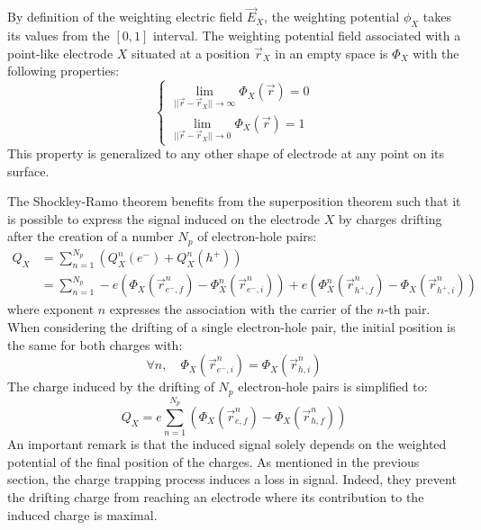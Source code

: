 By definition of the weighting electric field $\vec{E}_X$, the weighting potential $\phi_X$ takes its values from the $[0,1]$ interval. The weighting potential field associated with a point-like electrode $X$ situated at a position $\vec{r}_X$ in an empty space is $\Phi_X$ with the following properties:
\begin{equation}
\label{eq:ramo-particle}
\begin{cases}
\lim_{||\vec{r} - \vec{r}_X|| \to \infty} \Phi_X(\vec{r}) = 0 \\
\lim_{||\vec{r} - \vec{r}_X|| \to 0} \Phi_X(\vec{r}) = 1
\end{cases}
\end{equation}
This property is generalized to any other shape of electrode at any point on its surface.

The Shockley-Ramo theorem benefits from the superposition theorem such that it is possible to express the signal induced on the electrode $X$ by charges drifting after the creation of a number $N_p$ of electron-hole pairs:
\begin{equation}
\begin{split}
Q_X &= \sum_{n=1}^{N_p} \left( Q_X^n(e^-) + Q_X^n(h^+) \right) \\
&= \sum_{n=1}^{N_p} -e \left( \Phi_X (\vec{r}_{e^-,f}^n) - \Phi_X^n (\vec{r}_{e^-,i}^n) \right) +e \left( \Phi_X^n (\vec{r}_{h^+,f}^n) - \Phi_X (\vec{r}_{h^+,i}^n) \right)
\end{split}
\end{equation}
where exponent $n$ expresses the association with the carrier of the $n$-th pair.
When considering the drifting of a single electron-hole pair, the initial position is the same for both charges with:
\begin{equation}
\forall n, \quad \Phi_X(\vec{r}_{e^-,i}^n) = \Phi_X (\vec{r}_{h,i}^n)
\end{equation}
The charge induced by the drifting of $N_p$ electron-hole pairs is simplified to:
\begin{equation}
\label{eq:ramo-induced-charge}
Q_X = e \sum_{n=1}^{N_p} \left( \Phi_X (\vec{r}_{e,f}^n) - \Phi_X (\vec{r}_{h,f}^n) \right)
\end{equation}
An important remark is that the induced signal solely depends on the weighted potential of the final position of the charges. As mentioned in the previous section, the charge trapping process induces a loss in signal. Indeed, they prevent the drifting charge from reaching an electrode where its contribution to the induced charge is maximal.

